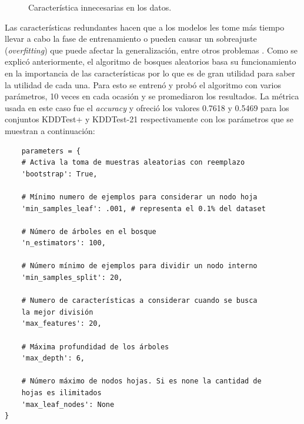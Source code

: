 \begin{figure}[t]
    \centering

    \caption{Característica innecesarias en los datos.}
    \label{fig:redundant}
\end{figure}

Las características redundantes hacen que a los modelos les tome más tiempo llevar a cabo la fase de entrenamiento o pueden causar un sobreajuste (\textit{overfitting}) que puede afectar la generalización, entre otros problemas \cite{tuv2009feature}. Como se explicó anteriormente, el algoritmo de bosques aleatorios basa su funcionamiento en la importancia de las características por lo que es de gran utilidad para saber la utilidad de cada una. Para esto se entrenó y probó el algoritmo con varios parámetros, 10 veces en cada ocasión y se promediaron los resultados. La métrica usada en este caso fue el \textit{accuracy} y ofreció los valores 0.7618 y 0.5469 para los conjuntos KDDTest+ y KDDTest-21 respectivamente con los parámetros que se muestran a continuación:

\begin{verbatim}
    parameters = {
    # Activa la toma de muestras aleatorias con reemplazo
    'bootstrap': True,

    # Mínimo numero de ejemplos para considerar un nodo hoja
    'min_samples_leaf': .001, # representa el 0.1% del dataset

    # Número de árboles en el bosque
    'n_estimators': 100,

    # Número mínimo de ejemplos para dividir un nodo interno
    'min_samples_split': 20,

    # Numero de características a considerar cuando se busca 
    la mejor división
    'max_features': 20,

    # Máxima profundidad de los árboles
    'max_depth': 6,

    # Número máximo de nodos hojas. Si es none la cantidad de 
    hojas es ilimitados
    'max_leaf_nodes': None
}
\end{verbatim}

